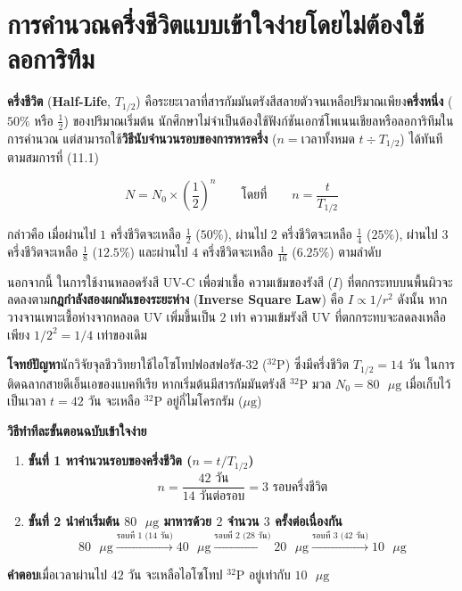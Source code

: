 \section{การคำนวณครึ่งชีวิตแบบเข้าใจง่ายโดยไม่ต้องใช้ลอการิทึม}

\textbf{ครึ่งชีวิต} (\textbf{Half-Life}, $T_{1/2}$) คือระยะเวลาที่สารกัมมันตรังสีสลายตัวจนเหลือปริมาณเพียง\textbf{ครึ่งหนึ่ง} ($50\%$ หรือ $\frac{1}{2}$) ของปริมาณเริ่มต้น นักศึกษาไม่จำเป็นต้องใช้ฟังก์ชันเอกซ์โพเนนเชียลหรือลอการิทึมในการคำนวณ แต่สามารถใช้\textbf{วิธีนับจำนวนรอบของการหารครึ่ง} ($n = \text{เวลาทั้งหมด } t \div T_{1/2}$) ได้ทันทีตามสมการที่ (11.1)

\begin{equation}
    N = N_0 \times \left(\frac{1}{2}\right)^n \qquad \text{โดยที่} \qquad n = \frac{t}{T_{1/2}}
\end{equation}

กล่าวคือ เมื่อผ่านไป $1$ ครึ่งชีวิตจะเหลือ $\frac{1}{2}$ ($50\%$), ผ่านไป $2$ ครึ่งชีวิตจะเหลือ $\frac{1}{4}$ ($25\%$), ผ่านไป $3$ ครึ่งชีวิตจะเหลือ $\frac{1}{8}$ ($12.5\%$) และผ่านไป $4$ ครึ่งชีวิตจะเหลือ $\frac{1}{16}$ ($6.25\%$) ตามลำดับ

นอกจากนี้ ในการใช้งานหลอดรังสี UV-C เพื่อฆ่าเชื้อ ความเข้มของรังสี ($I$) ที่ตกกระทบบนพื้นผิวจะลดลงตาม\textbf{กฎกำลังสองผกผันของระยะห่าง} (\textbf{Inverse Square Law}) คือ $I \propto 1/r^2$ ดังนั้น หากวางจานเพาะเชื้อห่างจากหลอด UV เพิ่มขึ้นเป็น $2$ เท่า ความเข้มรังสี UV ที่ตกกระทบจะลดลงเหลือเพียง $1/2^2 = 1/4$ เท่าของเดิม

\begin{worked}
\textbf{โจทย์ปัญหา}\quad นักวิจัยจุลชีววิทยาใช้ไอโซโทปฟอสฟอรัส-32 ($^{32}\text{P}$) ซึ่งมีครึ่งชีวิต $T_{1/2} = 14\text{ วัน}$ ในการติดฉลากสายดีเอ็นเอของแบคทีเรีย หากเริ่มต้นมีสารกัมมันตรังสี $^{32}\text{P}$ มวล $N_0 = 80\text{ }\mu\text{g}$ เมื่อเก็บไว้เป็นเวลา $t = 42\text{ วัน}$ จะเหลือ $^{32}\text{P}$ อยู่กี่ไมโครกรัม ($\mu\text{g}$)

\textbf{วิธีทำทีละขั้นตอนฉบับเข้าใจง่าย}
\begin{enumerate}
    \item \textbf{ขั้นที่ 1 หาจำนวนรอบของครึ่งชีวิต ($n = t / T_{1/2}$)}
    \[
        n = \frac{42\text{ วัน}}{14\text{ วันต่อรอบ}} = 3\text{ รอบครึ่งชีวิต}
    \]
    \item \textbf{ขั้นที่ 2 นำค่าเริ่มต้น $80\text{ }\mu\text{g}$ มาหารด้วย $2$ จำนวน $3$ ครั้งต่อเนื่องกัน}
    \[
        80\text{ }\mu\text{g} \xrightarrow{\text{รอบที่ 1 (14 วัน)}} 40\text{ }\mu\text{g} \xrightarrow{\text{รอบที่ 2 (28 วัน)}} 20\text{ }\mu\text{g} \xrightarrow{\text{รอบที่ 3 (42 วัน)}} 10\text{ }\mu\text{g}
    \]
\end{enumerate}
\textbf{คำตอบ}\quad เมื่อเวลาผ่านไป $42\text{ วัน}$ จะเหลือไอโซโทป $^{32}\text{P}$ อยู่เท่ากับ $10\text{ }\mu\text{g}$
\end{worked}

